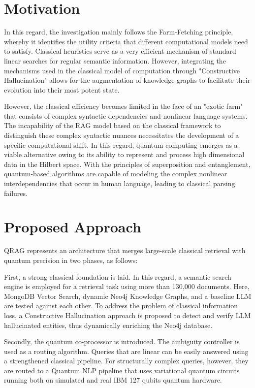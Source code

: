 \section{Motivation}

In this regard, the investigation mainly follows the Farm-Fetching principle, whereby it identifies the utility criteria that different computational models need to satisfy. Classical heuristics serve as a very efficient mechanism of standard linear searches for regular semantic information. However, integrating the mechanisms used in the classical model of computation through "Constructive Hallucination" allows for the augmentation of knowledge graphs to facilitate their evolution into their most potent state.

However, the classical efficiency becomes limited in the face of an "exotic farm" that consists of complex syntactic dependencies and nonlinear language systems. The incapability of the RAG model based on the classical framework to distinguish these complex syntactic nuances necessitates the development of a specific computational shift. In this regard, quantum computing emerges as a viable alternative owing to its ability to represent and process high dimensional data in the Hilbert space. With the principles of superposition and entanglement, quantum-based algorithms are capable of modeling the complex nonlinear interdependencies that occur in human language, leading to classical parsing failures.

\section{Proposed Approach}

QRAG represents an architecture that merges large-scale classical retrieval with quantum precision in two phases, as follows:

First, a strong classical foundation is laid. In this regard, a semantic search engine is employed for a retrieval task using more than 130,000 documents. Here, MongoDB Vector Search, dynamic Neo4j Knowledge Graphs, and a baseline LLM are tested against each other. To address the problem of classical information loss, a Constructive Hallucination approach is proposed to detect and verify LLM hallucinated entities, thus dynamically enriching the Neo4j database.

Secondly, the quantum co-processor is introduced. The ambiguity controller is used as a routing algorithm. Queries that are linear can be easily answered using a strengthened classical pipeline. For structurally complex queries, however, they are routed to a Quantum NLP pipeline that uses variational quantum circuits running both on simulated and real IBM 127 qubits quantum hardware.


